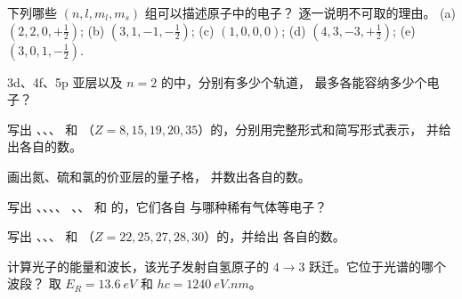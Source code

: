 \begin{exercise}[$\star$]\label{exo:b1:quantum-numbers:1}
下列哪些 $(n, l, m_l, m_s)$ 组可以描述原子中的电子？
逐一说明不可取的理由。
(a) $(2, 2, 0, +\tfrac12)$; (b) $(3, 1, -1, -\tfrac12)$;
(c) $(1, 0, 0, 0)$; (d) $(4, 3, -3, +\tfrac12)$; (e) $(3, 0, 1, -\tfrac12)$.
\end{exercise}

\begin{exercise}[$\star$]\label{exo:b1:quantum-numbers:2}
3d、4f、5p 亚层以及 $n = 2$ 的中，分别有多少个轨道，
最多各能容纳多少个电子？
\end{exercise}

\begin{exercise}[$\star$]\label{exo:b1:quantum-numbers:3}
写出 、、、
和 （$Z = 8, 15, 19, 20, 35$）的，分别用完整形式和简写形式表示，
并给出各自的数。
\end{exercise}

\begin{exercise}[$\star$]\label{exo:b1:quantum-numbers:4}
画出氮、硫和氯的价亚层的量子格，
并数出各自的数。
\end{exercise}

\begin{exercise}[$\star\star$]\label{exo:b1:quantum-numbers:5}
写出 、、、、
、、 和  的，它们各自
与哪种稀有气体等电子？
\end{exercise}

\begin{exercise}[$\star\star$]\label{exo:b1:quantum-numbers:6}
写出 、、、
 和 （$Z = 22, 25, 27, 28, 30$）的，并给出
各自的数。
\end{exercise}

\begin{exercise}[$\star\star$]\label{exo:b1:quantum-numbers:7}
计算光子的能量和波长，该光子发射自氢原子的
$4 \to 3$ 跃迁。它位于光谱的哪个波段？
取 $E_R = \qty{13.6}{eV}$ 和 $hc = \qty{1240}{eV.nm}$。
\end{exercise}

